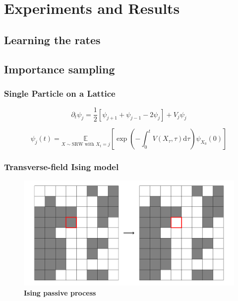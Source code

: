 
\chapter{Experiments and Results}
\label{chapter6}

\ifpdf
\graphicspath{{Chapter6/Figs/Raster/}{Chapter6/Figs/PDF/}{Chapter6/Figs/}}
\else
\graphicspath{{Chapter6/Figs/Vector/}{Chapter6/Figs/}}
\fi

\section{Learning the rates}

\section{Importance sampling}

\subsection{Single Particle on a Lattice}
\begin{equation}
	\partial_{t} \psi_{j}=\frac{1}{2}\left[\psi_{j+1}+\psi_{j-1}-2 \psi_{j}\right]+V_{j} \psi_{j}
\end{equation}

\begin{equation}
	\psi_{j}(t)=\underset{X \sim \mathrm{SRW} \text { with } X_{t}=j}{\mathbb{E}} \left[\exp \left(-\int_{0}^{t}  V\left(X_{\tau}, \tau\right) \mathrm{d} \tau \right) \psi_{X_{0}}(0)\right]
\end{equation}

\subsection{Transverse-field Ising model}
\label{sec:res-im}
\begin{figure}[h]
	\centering
	\includegraphics[width=\linewidth]{Chapter6/Figs/Vector/ising_passive}
	\caption[Ising passive process]{\textbf{Ising passive process}}	
	\label{fig:isingpassive}
\end{figure}

